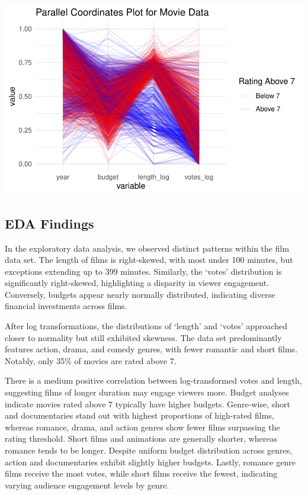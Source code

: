 \documentclass[
  11pt,
]{article}
\begin{document}
\includegraphics{Group_07_Analysis_files/figure-pdf/unnamed-chunk-20-1.pdf}

\hypertarget{eda-findings}{%
\subsection{EDA Findings}\label{eda-findings}}

In the exploratory data analysis, we observed distinct patterns within
the film data set. The length of films is right-skewed, with most under
100 minutes, but exceptions extending up to 399 minutes. Similarly, the
`votes' distribution is significantly right-skewed, highlighting a
disparity in viewer engagement. Conversely, budgets appear nearly
normally distributed, indicating diverse financial investments across
films.

After log transformations, the distributions of `length' and `votes'
approached closer to normality but still exhibited skewness. The data
set predominantly features action, drama, and comedy genres, with fewer
romantic and short films. Notably, only 35\% of movies are rated above
7.

There is a medium positive correlation between log-transformed votes and
length, suggesting films of longer duration may engage viewers more.
Budget analyses indicate movies rated above 7 typically have higher
budgets. Genre-wise, short and documentaries stand out with highest
proportions of high-rated films, whereas romance, drama, and action
genres show fewer films surpassing the rating threshold. Short films and
animations are generally shorter, whereas romance tends to be longer.
Despite uniform budget distribution across genres, action and
documentaries exhibit slightly higher budgets. Lastly, romance genre
films receive the most votes, while short films receive the fewest,
indicating varying audience engagement levels by genre.
\end{document}
